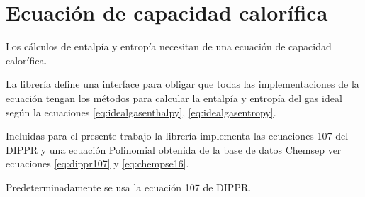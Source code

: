 \section{Ecuación de capacidad calorífica}\label{sec:cp}

	Los cálculos de entalpía y entropía necesitan de una ecuación de capacidad calorífica.

	La librería \Materia  define una interface para obligar que todas las implementaciones de la ecuación tengan los métodos para calcular la entalpía y entropía del gas ideal según la ecuaciones \ref{eq:idealgasenthalpy}, \ref{eq:idealgasentropy}.

	Incluidas para el presente trabajo la librería \Materia implementa las ecuaciones 107 del DIPPR y una ecuación Polinomial obtenida de la base de datos Chemsep ver ecuaciones \ref{eq:dippr107} y \ref{eq:chempse16}.
	
	Predeterminadamente se usa la ecuación 107 de DIPPR.